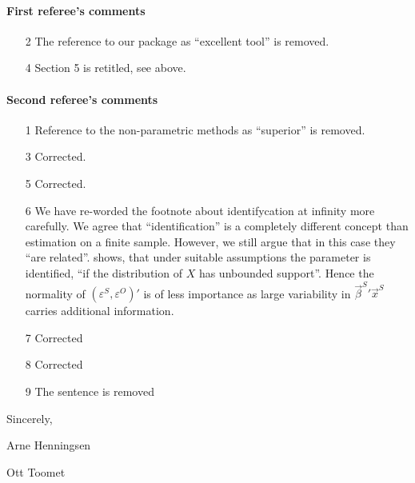 \documentclass[a4paper]{article}
\begin{document}
\paragraph{First referee's comments}

\begin{itemize}
\item[2] The reference to our package as ``excellent tool'' is removed.
\item[4] Section 5 is retitled, see above.
\end{itemize}

\paragraph{Second referee's comments}

\begin{itemize}
\item[1] Reference to the non-parametric methods as ``superior'' is
  removed.
\item[3] Corrected.
\item[5] Corrected.
\item[6] We have re-worded the footnote about identifycation at
  infinity more carefully.  We agree that ``identification'' is a
  completely different concept than estimation on a finite sample.
  However, we still argue that in this case they ``are related''.
  \cite[p. 205]{chamberlain1986} shows, that under suitable
  assumptions the parameter is identified, ``if the distribution of
  $X$ has unbounded support''.  Hence the normality of
  $(\varepsilon^{S}, \varepsilon^{O})'$ is of less importance as large
  variability in ${\vec{\beta}^{S}}' \vec{x}^{S}$ carries additional
  information.
\item[7] Corrected
\item[8] Corrected
\item[9] The sentence is removed
\end{itemize}

\bigskip

Sincerely,

\bigskip

Arne Henningsen

Ott Toomet



\end{document}
